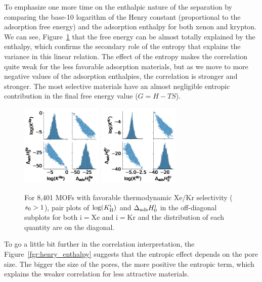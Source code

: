 \documentclass[main.tex]{subfiles}
\begin{document}
To emphasize one more time on the enthalpic nature of the separation by comparing the base-10 logarithm of the Henry constant (proportional to the adsorption free energy) and the adsorption enthalpy for both xenon and krypton. We can see, Figure~\ref{fgr:SI:HK} that the free energy can be almost totally explained by the enthalpy, which confirms the secondary role of the entropy that explains the variance in this linear relation. The effect of the entropy makes the correlation quite weak for the less favorable adsorption materials, but as we move to more negative values of the adsorption enthalpies, the correlation is stronger and stronger. The most selective materials have an almost negligible entropic contribution in the final free energy value ($G=H-TS$).

\begin{figure}[h]
  \centering
    \includegraphics[width=0.35\textwidth]{figures/2-thermo/H_K_Xe.jpg}
    \includegraphics[width=0.35\textwidth]{figures/2-thermo/H_K_Kr.jpg}
    \caption{For 8,401 MOFs with favorable thermodynamic Xe/Kr selectivity ($s_{\text{0}} > 1$), pair plots of $\log(K_{\text{H}}^{\text{i}})$ and $\Delta_{\text{ads}}H^{\text{i}}_{\text{0}}$ in the off-diagonal subplots for both i$=$Xe and i$=$Kr and the distribution of each quantity are on the diagonal.}\label{fgr:SI:HK}
\end{figure}

To go a little bit further in the correlation interpretation, the Figure~\ref{fgr:henry_enthalpy} suggests that the entropic effect depends on the pore size. The bigger the size of the pores, the more positive the entropic term, which explains the weaker correlation for less attractive materials. 
\end{document}
